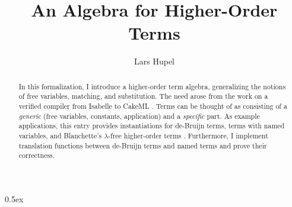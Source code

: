 \documentclass[11pt,a4paper]{report}
\begin{document}
\title{An Algebra for Higher-Order Terms}
\author{Lars Hupel}
\maketitle

\begin{abstract}
  In this formalization, I introduce a higher-order term algebra, generalizing the notions of
  free variables, matching, and substitution. The need arose from the work on a verified compiler
  from Isabelle to CakeML \cite{hupel2018compiler}. Terms can be thought of as consisting of a
  \emph{generic} (free variables, constants, application) and a \emph{specific} part. As example
  applications, this entry provides instantiations for de-Bruijn terms, terms with named variables,
  and Blanchette's $\lambda$-free higher-order terms \cite{blanchette2016lambda}. Furthermore, I
  implement translation functions between de-Bruijn terms and named terms and prove their
  correctness.
\end{abstract}

\tableofcontents

\clearpage

\parindent 0pt\parskip 0.5ex





\end{document}
